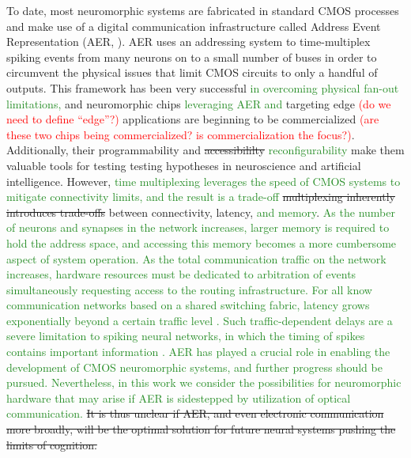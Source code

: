 \documentclass[twocolumn]{article}
\begin{document}
To date, most neuromorphic systems are fabricated in standard CMOS processes and make use of a digital communication infrastructure called Address Event Representation (AER, \cite{bo2000,payu2017}). AER uses an addressing system to time-multiplex spiking events from many neurons on to a small number of buses in order to circumvent the physical issues that limit CMOS circuits to only a handful of outputs. This framework has been very successful \textcolor{ForestGreen}{in overcoming physical fan-out limitations,} and neuromorphic chips \textcolor{ForestGreen}{leveraging AER and} targeting edge \textcolor{red}{(do we need to define ``edge''?)} applications are beginning to be commercialized \cite{merolla2014million, davies2018loihi} \textcolor{red}{(are these two chips being commercialized? is commercialization the focus?)}. Additionally, their programmability and \sout{accessibililty} \textcolor{ForestGreen}{reconfigurability} make them valuable tools for testing testing hypotheses in neuroscience and artificial intelligence. However, \textcolor{ForestGreen}{time multiplexing leverages the speed of CMOS systems to mitigate connectivity limits, and the result is a trade-off} \sout{multiplexing inherently introduces trade-offs} between connectivity, latency, \textcolor{ForestGreen}{and memory}. \textcolor{ForestGreen}{As the number of neurons and synapses in the network increases, larger memory is required to hold the address space, and accessing this memory becomes a more cumbersome aspect of system operation. As the total communication traffic on the network increases, hardware resources must be dedicated to arbitration of events simultaneously requesting access to the routing infrastructure. For all know communication networks based on a shared switching fabric, latency grows exponentially beyond a certain traffic level \cite{hepa2011}. Such traffic-dependent delays are a severe limitation to spiking neural networks, in which the timing of spikes contains important information \cite{}. AER has played a crucial role in enabling the development of CMOS neuromorphic systems, and further progress should be pursued. Nevertheless, in this work we consider the possibilities for neuromorphic hardware that may arise if AER is sidestepped by utilization of optical communication.} \sout{It is thus unclear if AER, and even electronic communication more broadly, will be the optimal solution for future neural systems pushing the limits of cognition.}
\end{document}
